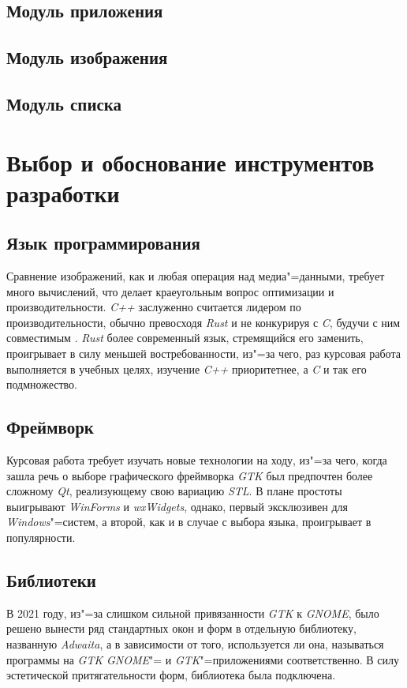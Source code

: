 \subsection{Модуль приложения}

\subsection{Модуль изображения}

\subsection{Модуль списка}

\section{Выбор и обоснование инструментов разработки}

\subsection{Язык программирования}
Сравнение изображений, как и любая операция над медиа"=данными, требует много
вычислений, что делает краеугольным вопрос оптимизации и производительности.
\textit{C++} заслуженно считается лидером по производительности, обычно
превосходя \textit{Rust} и не конкурируя с \textit{C}, будучи с ним совместимым
\cite{benchmarksgame}. \textit{Rust} более современный язык, стремящийся его
заменить, проигрывает в силу меньшей востребованности, из"=за чего, раз курсовая
работа выполняется в учебных целях, изучение \textit{C++} приоритетнее, а
\textit{C} и так его подмножество.

\subsection{Фреймворк}
Курсовая работа требует изучать новые технологии на ходу, из"=за чего, когда
зашла речь о выборе графического фреймворка \textit{GTK} был предпочтен более
сложному \textit{Qt}, реализующему свою вариацию \textit{STL}. В плане простоты
выигрывают \textit{WinForms} и \textit{wxWidgets}, однако, первый эксклюзивен
для \textit{Windows}"=систем, а второй, как и в случае с выбора языка,
проигрывает в популярности.

\subsection{Библиотеки}
В 2021 году, из"=за слишком сильной привязанности \textit{GTK} к \textit{GNOME},
было решено вынести ряд стандартных окон и форм в отдельную библиотеку,
названную \textit{Adwaita}, а в зависимости от того, используется ли она,
называться программы на \textit{GTK} \textit{GNOME}"= и
\textit{GTK}"=приложениями соответственно. В силу эстетической притягательности
форм, библиотека была подключена.

